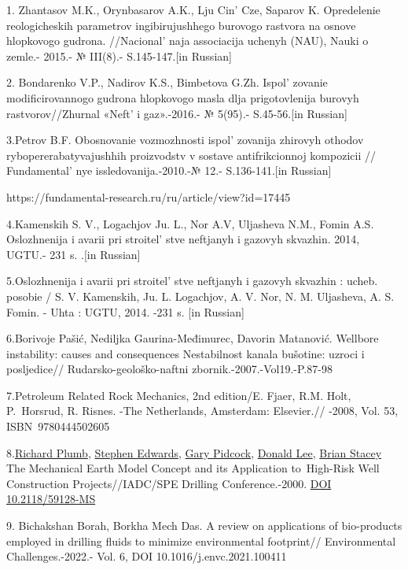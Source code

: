 \begin{noparindent}

1. Zhantasov M.K., Orynbasarov A.K., Lju Cin'{} Cze,
Saparov K. Opredelenie reologicheskih parametrov ingibirujushhego
burovogo rastvora na osnove hlopkovogo gudrona.
//Nacional' naja associacija uchenyh (NAU), Nauki o
zemle.- 2015.- № III(8).- S.145-147.{[}in Russian{]}

2. Bondarenko V.P., Nadirov K.S., Bimbetova G.Zh.
Ispol' zovanie modificirovannogo gudrona hlopkovogo masla
dlja prigotovlenija burovyh rastvorov//Zhurnal «Neft'{} i
gaz».-2016.- № 5(95).- S.45-56.{[}in Russian{]}

3.Petrov B.F. Obosnovanie vozmozhnosti ispol' zovanija
zhirovyh othodov rybopererabatyvajushhih proizvodstv v sostave
antifrikcionnoj kompozicii // Fundamental' nye
issledovanija.-2010.-№ 12.- S.136-141.{[}in Russian{]}

https://fundamental-research.ru/ru/article/view?id=17445

4.Kamenskih S. V., Logachjov Ju. L., Nor A.V, Uljasheva N.M., Fomin A.S.
Oslozhnenija i avarii pri stroitel' stve neftjanyh i
gazovyh skvazhin. 2014, UGTU.- 231 s. .{[}in Russian{]}

5.Oslozhnenija i avarii pri stroitel' stve neftjanyh i
gazovyh skvazhin : ucheb. posobie / S. V. Kamenskih, Ju. L. Logachjov,
A. V. Nor, N. M. Uljasheva, A. S. Fomin. - Uhta : UGTU, 2014. -231 s.
{[}in Russian{]}

6.Borivoje Pašić, Nediljka Gaurina-Međimurec, Davorin Matanović.
Wellbore instability: causes and consequences Nestabilnost kanala
bušotine: uzroci i posljedice// Rudarsko-geološko-naftni
zbornik.-2007.-Vol19.-P.87-98

7.Petroleum Related Rock Mechanics, 2nd edition/E. Fjaer, R.M. Holt,
P.~Horsrud, R. Risnes. -The Netherlands, Amsterdam: Elsevier.// -2008,
Vol. 53, ISBN~9780444502605

8.\href{javascript:;}{Richard Plumb}, \href{javascript:;}{Stephen
Edwards}, \href{javascript:;}{Gary Pidcock}, \href{javascript:;}{Donald
Lee}, \href{javascript:;}{Brian Stacey} The Mechanical Earth Model
Concept and its Application to~High-Risk Well Construction
Projects//IADC/SPE Drilling Conference.-2000.
\href{https://doi.org/10.2118/59128-MS}{DOI 10.2118/59128-MS}

9. Bichakshan Borah, Borkha Mech Das. A review on applications of
bio-products employed in drilling fluids to minimize environmental
footprint// Environmental Challenges.-2022.- Vol. 6, DOI
10.1016/j.envc.2021.100411


\end{noparindent}

